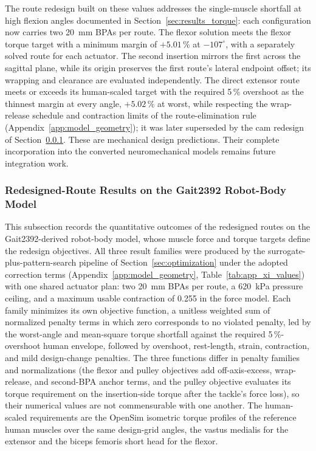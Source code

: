 The route redesign built on these values addresses the single-muscle shortfall at high flexion angles documented in Section~\ref{sec:results_torque}: each configuration now carries two \qty{20}{\mm} BPAs per route. The flexor solution meets the flexor torque target with a minimum margin of $+5.01$\,\% at $-107^{\circ}$, with a separately solved route for each actuator. The second insertion mirrors the first across the sagittal plane, while its origin preserves the first route's lateral endpoint offset; its wrapping and clearance are evaluated independently. The direct extensor route meets or exceeds its human-scaled target with the required 5\,\% overshoot as the thinnest margin at every angle, $+5.02$\,\% at worst, while respecting the wrap-release schedule and contraction limits of the route-elimination rule (Appendix~\ref{app:model_geometry}); it was later superseded by the cam redesign of Section~\ref{sec:route_redesign_results}. These are mechanical design predictions. Their complete incorporation into the converted neuromechanical models remains future integration work.

\subsubsection{Redesigned-Route Results on the Gait2392 Robot-Body Model}\label{sec:route_redesign_results}

This subsection records the quantitative outcomes of the redesigned routes on the Gait2392-derived robot-body model, whose muscle force and torque targets define the redesign objectives. All three result families were produced by the surrogate-plus-pattern-search pipeline of Section~\ref{sec:optimization} under the adopted correction terms (Appendix~\ref{app:model_geometry}, Table~\ref{tab:app_xi_values}) with one shared actuator plan: two \qty{20}{\mm} BPAs per route, a \qty{620}{\kPa} pressure ceiling, and a maximum usable contraction of 0.255 in the force model. Each family minimizes its own objective function, a unitless weighted sum of normalized penalty terms in which zero corresponds to no violated penalty, led by the worst-angle and mean-square torque shortfall against the required 5\,\%-overshoot human envelope, followed by overshoot, rest-length, strain, contraction, and mild design-change penalties. The three functions differ in penalty families and normalizations (the flexor and pulley objectives add off-axis-excess, wrap-release, and second-BPA anchor terms, and the pulley objective evaluates its torque requirement on the insertion-side torque after the tackle's force loss), so their numerical values are not commensurable with one another. The human-scaled requirements are the OpenSim isometric torque profiles of the reference human muscles over the same design-grid angles, the vastus medialis for the extensor and the biceps femoris short head for the flexor.

